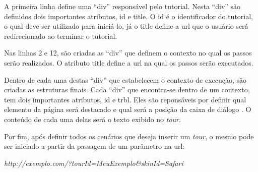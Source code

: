 A primeira linha define uma ``div'' responsável pelo tutorial. Nesta ``div'' são definidos dois importantes atributos, id e title. O id é o identificador do tutorial, o qual deve ser utilizado para iniciá-lo, já o title define a url que o usuário será redirecionado ao terminar o tutorial.

Nas linhas 2 e 12, são criadas as ``div'' que definem o contexto no qual os passos serão realizados. O atributo title define a url na qual os passos serão executados.

Dentro de cada uma destas ``div'' que estabelecem o contexto de execução, são criadas as estruturas finais. Cada ``div'' que encontra-se dentro de um contexto, tem dois importantes atributos, id e trbl. Eles são reponsáveis por definir qual elemento da página será destacado e qual será a posição da caixa de diálogo \cite{AJ}. O conteúdo de cada uma delas será o texto exibido no \textit{tour}.

Por fim, após definir todos os cenários que deseja inserir um \textit{tour}, o mesmo pode ser iniciado a partir da passagem de um parâmetro na url:

\begin{center}
\textit{http://exemplo.com/?tourId=MeuExemplo\&skinId=Safari}
\end{center}